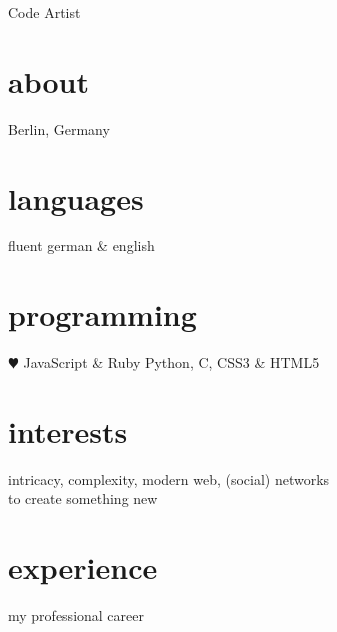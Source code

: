 \documentclass[]{friggeri-cv}
\begin{document}
       {Code Artist}


\begin{aside}
  \section{about}
    Berlin, Germany
    ~
  \section{languages}
    fluent german \& english
  \section{programming}
    {\color{red} $\varheartsuit$} JavaScript \& Ruby
    Python, C,
    CSS3 \& HTML5
\end{aside}

\section{interests}

intricacy, complexity, modern web, (social) networks\\
to create something new

\section{experience}
my professional career
\end{document}

